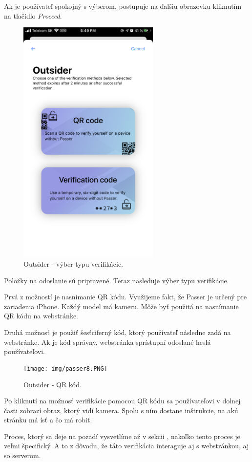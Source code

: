 Ak je používateľ spokojný s výberom, postupuje na ďalšiu obrazovku kliknutím na tlačidlo \textit{Proceed}.

\begin{figure}[H]
  \centering
  \includegraphics[width=7cm]{img/passer7.PNG}
  \caption{Outsider - výber typu verifikácie.}
  \label{passer7}
\end{figure}
Položky na odoslanie sú pripravené. Teraz nasleduje výber typu verifikácie.

Prvá z možností je nasnímanie QR kódu. Využijeme fakt, že Passer je určený pre zariadenia iPhone. Každý model má kameru. Môže byť použitá na nasnímanie QR kódu na webstránke.

Druhá možnosť je použiť šesťciferný kód, ktorý používateľ následne zadá na webstránke. Ak je kód správny, webstránka sprístupní odoslané heslá používateľovi.

\begin{figure}[H]
  \centering
  \texttt{[image: img/passer8.PNG]}
  \caption{Outsider - QR kód.}
  \label{passer8}
\end{figure}

Po kliknutí na možnosť verifikácie pomocou QR kódu sa používateľovi v dolnej časti zobrazí obraz, ktorý vidí kamera. Spolu s ním dostane inštrukcie, na akú stránku má ísť a čo má robiť. 

Proces, ktorý sa deje na pozadí vysvetlíme až v sekcii , nakoľko tento proces je veľmi špecifický. A to z dôvodu, že táto verifikácia interaguje aj s webstránkou, aj so serverom.

